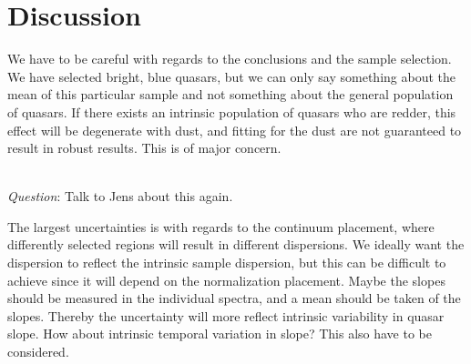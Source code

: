 \documentclass{aa}    %
\newcommand{\figlabel}[1]{\label{fig:#1}}
\newcommand{\sectlabel}[1]{\label{sect:#1}}
\newcommand{\todo}[3]{{\color{#2}\emph{#1}: #3}}
\newcommand{\qtodo}[1]{\todo{\\ Question}{red}{#1}}
\begin{document}
% 
%  


\section{Discussion}  \sectlabel{discuss}


We have to be careful with regards to the conclusions and the sample selection. We have selected bright, blue quasars, but we can only say something about the mean of this particular sample and not something about the general population of quasars. If there exists an intrinsic population of quasars who are redder, this effect will be degenerate with dust, and fitting for the dust are not guaranteed to result in robust results. This is of major concern.  

\qtodo{Talk to Jens about this again}.

The largest uncertainties is with regards to the continuum placement, where differently selected regions will result in different dispersions. We ideally want the dispersion to reflect the intrinsic sample dispersion, but this can be difficult to achieve since it will depend on the normalization placement. Maybe the slopes should be measured in the individual spectra, and a mean should be taken of the slopes. Thereby the uncertainty will more reflect intrinsic variability in quasar slope. How about intrinsic temporal variation in slope? This also have to be considered. 
\end{document}
